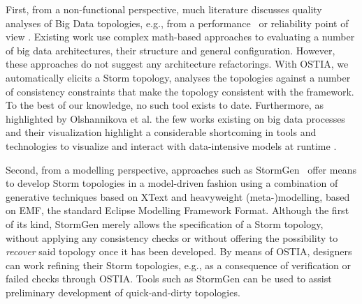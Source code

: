 \documentclass[smallextended]{svjour3}       %
\begin{document}
First, from a non-functional perspective, much literature discusses quality analyses of Big Data topologies, e.g., from a performance~\cite{perfbd} or reliability point of view \cite{bigdatareliab}. Existing work use complex math-based approaches to evaluating a number of big data architectures, their structure and general configuration. However, these approaches do not suggest any architecture refactorings. With OSTIA, we automatically elicits a Storm topology, analyses the topologies against a number of consistency constraints that make the topology consistent with the framework. To the best of our knowledge, no such tool exists to date. Furthermore, as highlighted by Olshannikova et al. \cite{Olshannikova2015} the few works existing on big data processes and their visualization highlight a considerable shortcoming in tools and technologies to visualize and interact with data-intensive models at runtime \cite{Olshannikova2015}.

Second, from a modelling perspective, approaches such as StormGen~\cite{stormgen} offer means to develop Storm topologies in a model-driven fashion using a combination of generative techniques based on XText and heavyweight (meta-)modelling, based on EMF, the standard Eclipse Modelling Framework Format. Although the first of its kind, StormGen merely allows the specification of a Storm topology, without applying any consistency checks or without offering the possibility to \emph{recover} said topology once it has been developed. By means of OSTIA, designers can work refining their Storm topologies, e.g., as a consequence of verification or failed checks through OSTIA. Tools such as StormGen can be used to assist preliminary development of quick-and-dirty topologies.
\end{document}
